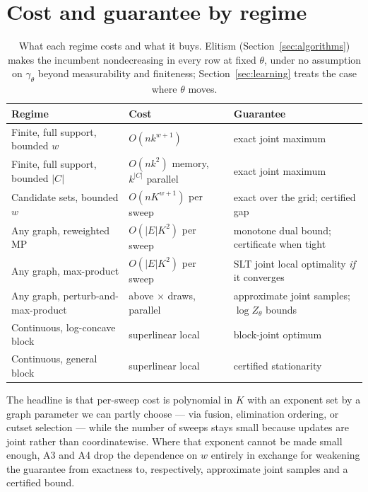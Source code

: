 \section{Cost and guarantee by regime}
\label{sec:complexity}

\begin{table}[h]
    \centering
    \small
    \begin{tabular}{@{}p{4.1cm}p{3.7cm}p{5.1cm}@{}}
        \toprule
        \textbf{Regime} & \textbf{Cost} & \textbf{Guarantee} \\
        \midrule
        Finite, full support, bounded $w$ & $O(n k^{w+1})$ & exact joint maximum \\
        Finite, full support, bounded $\lvert C \rvert$ & $O(n k^2)$ memory, $k^{\lvert C \rvert}$ parallel & exact joint maximum \\
        Candidate sets, bounded $w$ & $O(n K^{w+1})$ per sweep & exact over the grid; certified gap \\
        Any graph, reweighted MP & $O(\lvert E \rvert K^2)$ per sweep & monotone dual bound; certificate when tight \\
        Any graph, max-product & $O(\lvert E \rvert K^2)$ per sweep & SLT joint local optimality \emph{if} it converges \\
        Any graph, perturb-and-max-product & above $\times$ draws, parallel & approximate joint samples; $\log Z_{\theta}$ bounds \\
        Continuous, log-concave block & superlinear local & block-joint optimum \\
        Continuous, general block & superlinear local & certified stationarity \\
        \bottomrule
    \end{tabular}
    \caption{What each regime costs and what it buys. Elitism (Section~\ref{sec:algorithms}) makes the incumbent nondecreasing in every row at fixed $\theta$, under no assumption on $\gamma_\theta$ beyond measurability and finiteness; Section~\ref{sec:learning} treats the case where $\theta$ moves.}
    \label{tab:complexity}
\end{table}

The headline is that per-sweep cost is polynomial in $K$ with an exponent set by a graph parameter we can partly choose --- via fusion, elimination ordering, or cutset selection --- while the number of sweeps stays small because updates are joint rather than coordinatewise. Where that exponent cannot be made small enough, A3 and A4 drop the dependence on $w$ entirely in exchange for weakening the guarantee from exactness to, respectively, approximate joint samples and a certified bound.

